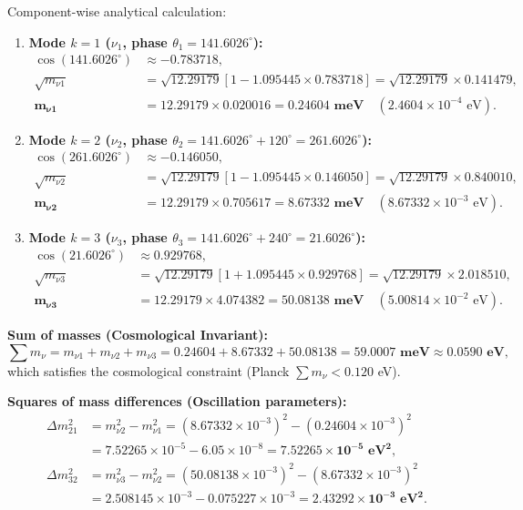 \documentclass[12pt,a4paper]{article}
\begin{document}
	Component-wise analytical calculation:
	\begin{enumerate}
	\item \textbf{Mode $k=1$ ($\nu_1$, phase $\theta_1 = 141.6026^\circ$):}
	\begin{align}
	\cos(141.6026^\circ) &\approx -0.783718, \\
	\sqrt{m_{\nu 1}} &= \sqrt{12.29179} \left[ 1 - 1.095445 \times 0.783718 \right] = \sqrt{12.29179} \times 0.141479, \\
	\mathbf{m_{\nu 1}} &= 12.29179 \times 0.020016 = \mathbf{0.24604 \text{ meV}} \quad (2.4604 \times 10^{-4} \text{ eV}).
	\end{align}
	\item \textbf{Mode $k=2$ ($\nu_2$, phase $\theta_2 = 141.6026^\circ + 120^\circ = 261.6026^\circ$):}
	\begin{align}
	\cos(261.6026^\circ) &\approx -0.146050, \\
	\sqrt{m_{\nu 2}} &= \sqrt{12.29179} \left[ 1 - 1.095445 \times 0.146050 \right] = \sqrt{12.29179} \times 0.840010, \\
	\mathbf{m_{\nu 2}} &= 12.29179 \times 0.705617 = \mathbf{8.67332 \text{ meV}} \quad (8.67332 \times 10^{-3} \text{ eV}).
	\end{align}
	\item \textbf{Mode $k=3$ ($\nu_3$, phase $\theta_3 = 141.6026^\circ + 240^\circ = 21.6026^\circ$):}
	\begin{align}
	\cos(21.6026^\circ) &\approx 0.929768, \\
	\sqrt{m_{\nu 3}} &= \sqrt{12.29179} \left[ 1 + 1.095445 \times 0.929768 \right] = \sqrt{12.29179} \times 2.018510, \\
	\mathbf{m_{\nu 3}} &= 12.29179 \times 4.074382 = \mathbf{50.08138 \text{ meV}} \quad (5.00814 \times 10^{-2} \text{ eV}).
	\end{align}
	\end{enumerate}
			
	\textbf{Sum of masses (Cosmological Invariant):}
	\begin{equation}
	\sum m_\nu = m_{\nu 1} + m_{\nu 2} + m_{\nu 3} = 0.24604 + 8.67332 + 50.08138 = \mathbf{59.0007 \text{ meV}} \approx \mathbf{0.0590 \text{ eV}},
	\end{equation}
	which satisfies the cosmological constraint (Planck $\sum m_\nu < 0.120$ eV).
			
	\textbf{Squares of mass differences (Oscillation parameters):}
	\begin{align}
	\Delta m_{21}^2 &= m_{\nu 2}^2 - m_{\nu 1}^2 = (8.67332 \times 10^{-3})^2 - (0.24604 \times 10^{-3})^2 \nonumber \\
	&= 7.52265 \times 10^{-5} - 6.05 \times 10^{-8} = \mathbf{7.52265 \times 10^{-5} \text{ eV}^2}, \\
	\Delta m_{32}^2 &= m_{\nu 3}^2 - m_{\nu 2}^2 = (50.08138 \times 10^{-3})^2 - (8.67332 \times 10^{-3})^2 \nonumber \\
	&= 2.508145 \times 10^{-3} - 0.075227 \times 10^{-3} = \mathbf{2.43292 \times 10^{-3} \text{ eV}^2}.
	\end{align}
			
\end{document}
